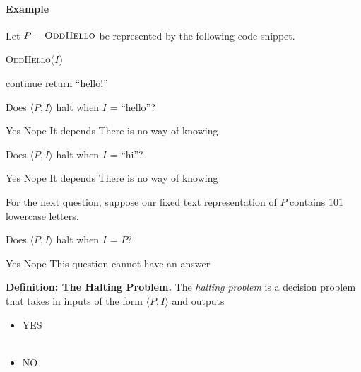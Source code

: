 \documentclass[11  pt]{article}
\begin{document}
\paragraph{Example}
Let $P = \textsc{OddHello}$ be represented by the following code snippet.
\begin{algorithm}[h]
    \textsc{OddHello}($I$)
    \begin{algorithmic}
        \State continue
        \EndWhile
        \Else
        \State return ``hello!''
        \EndIf
    \end{algorithmic}
\end{algorithm}

\begin{Qu}
    Does $\langle P, I\rangle$ halt when $I$ = ``hello''?
    \begin{itemize}
        \aitem Yes
        \bitem Nope
        \citem It depends
        \ditem There is no way of knowing
    \end{itemize}
\end{Qu}

\begin{Qu}
Does $\langle P, I\rangle$ halt when $I$ = ``hi''?
    \begin{itemize}
        \aitem Yes
        \bitem Nope
        \citem It depends
        \ditem There is no way of knowing
    \end{itemize}
\end{Qu}

For the next question, suppose our fixed text representation of $P$ contains $101$ lowercase letters.
\begin{Qu}
    Does $\langle P, I\rangle$ halt when $I$ = $P$?
    \begin{itemize}
        \aitem Yes
        \bitem Nope
        \citem This question cannot have an answer
    \end{itemize}
\end{Qu}

\vspace{1cm}

\newpage

\textbf{Definition: The Halting Problem.} The \emph{halting problem} is a decision problem that takes in inputs of the form $\langle P, I \rangle$ and outputs
\begin{itemize}
    \item YES \\ \\%
    \item NO \\%
\end{itemize}
\end{document}
